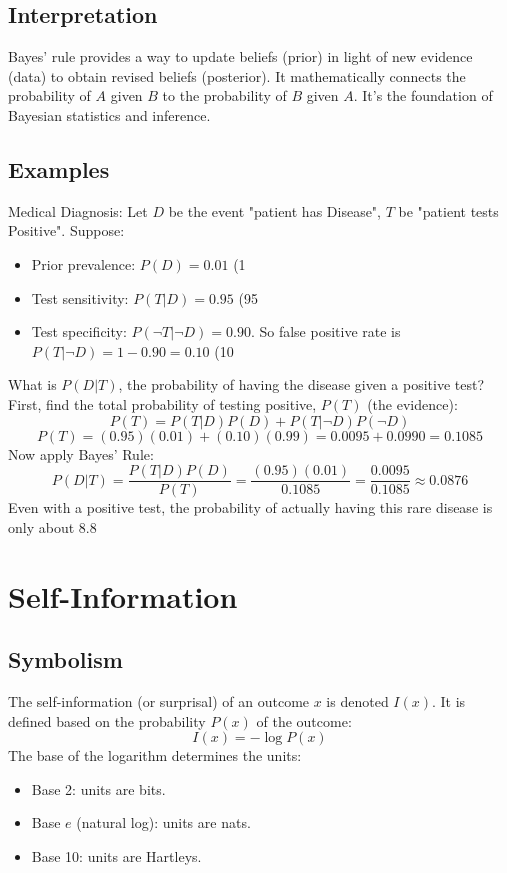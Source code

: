 \documentclass{article}
\begin{document}
\subsection*{Interpretation}
Bayes' rule provides a way to update beliefs (prior) in light of new evidence (data) to obtain revised beliefs (posterior). It mathematically connects the probability of $A$ given $B$ to the probability of $B$ given $A$. It's the foundation of Bayesian statistics and inference.

\subsection*{Examples}
Medical Diagnosis: Let $D$ be the event "patient has Disease", $T$ be "patient tests Positive".
Suppose:
\begin{itemize}
    \item Prior prevalence: $P(D) = 0.01$ (1%
    \item Test sensitivity: $P(T|D) = 0.95$ (95%
    \item Test specificity: $P(\neg T|\neg D) = 0.90$. So false positive rate is $P(T|\neg D) = 1 - 0.90 = 0.10$ (10%
\end{itemize}
What is $P(D|T)$, the probability of having the disease given a positive test?
First, find the total probability of testing positive, $P(T)$ (the evidence):
\[ P(T) = P(T|D)P(D) + P(T|\neg D)P(\neg D) \]
\[ P(T) = (0.95)(0.01) + (0.10)(0.99) = 0.0095 + 0.0990 = 0.1085 \]
Now apply Bayes' Rule:
\[ P(D|T) = \frac{P(T|D) P(D)}{P(T)} = \frac{(0.95)(0.01)}{0.1085} = \frac{0.0095}{0.1085} \approx 0.0876 \]
Even with a positive test, the probability of actually having this rare disease is only about 8.8%

\section{Self-Information}

\subsection*{Symbolism}
The self-information (or surprisal) of an outcome $x$ is denoted $I(x)$. It is defined based on the probability $P(x)$ of the outcome:
\[ I(x) = -\log P(x) \]
The base of the logarithm determines the units:
\begin{itemize}
    \item Base 2: units are bits.
    \item Base $e$ (natural log): units are nats.
    \item Base 10: units are Hartleys.
\end{itemize}
\end{document}
